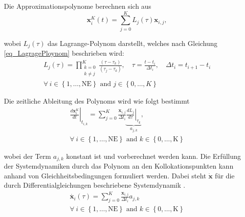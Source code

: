Die Approximationspolynome berechnen sich aus
\begin{equation} \label{eq_Approxpolynom2}
\boldsymbol{x}_i^{K}(t)=\sum_{j=0}^K L_j(\tau) \boldsymbol{x}_{i, j},
\end{equation}

\vspace*{-\baselineskip}wobei $L_j(\tau)$ das Lagrange-Polynom darstellt, welches nach Gleichung \ref{eq_LagragePloynom} beschrieben wird:
\begin{equation} \label{eq_LagragePloynom}
    \begin{gathered}
        L_j(\tau)=\prod_{\substack{k=0 \\ k \neq j}}^K \frac{\left(\tau-\tau_k\right)}{\left(\tau_j-\tau_k\right)}, \quad \tau=\frac{t-t_i}{\Delta t_i}, \quad \Delta t_i=t_{i+1}-t_i\\
        \forall~i\in \left\{1, \ldots, \mathrm{NE}\right\} \text{ and } j\in \left\{0, \ldots, K\right\}
    \end{gathered}
\end{equation}

Die zeitliche Ableitung des Polynoms wird wie folgt bestimmt
\begin{equation} \label{eq_AbleitungPolynomKollok}
    \begin{gathered}
        \left.\frac{d \boldsymbol{x}_i^K}{d t}\right|_{t_{i, k}}=\sum_{j=0}^K \frac{\boldsymbol{x}_{i, j}}{\Delta t_i} \underbrace{\left.\frac{d L_j}{d \tau}\right|_{\tau_k}}_{a_{j,k}},\\
        \forall~i\in \left\{1, \ldots, \mathrm{NE}\right\}\text{ and }k\in \left\{0, \ldots, \mathrm{K}\right\}
    \end{gathered}
\end{equation}

\vspace*{-\baselineskip}wobei der Term $a_{j,k}$ konstant ist und vorberechnet werden kann.
Die Erfüllung der Systemdynamiken durch das Polynom an den Kollokationspunkten kann anhand von Gleichheitsbedingungen formuliert werden.
Dabei steht $\boldsymbol{\dot{x}}$ für die durch Differentialgleichungen beschriebene Systemdynamik \cite[S.70]{DissGall}.
\begin{equation} \label{eq_GleichheitsbedAbleitungKollok}
    \begin{gathered}
        \dot{\boldsymbol{x}_i}(\tau) = \sum_{j=0}^K \frac{\boldsymbol{x}_{i, j}}{\Delta t_i} a_{j,k}\\
\forall~i\in \left\{1, \ldots, \mathrm{NE}\right\}\text{ and }k\in \left\{0, \ldots, \mathrm{K}\right\}
    \end{gathered}
\end{equation}

